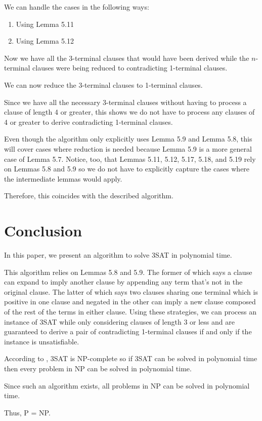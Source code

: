 \documentclass[manuscript]{acmart}
\begin{document}
    We can handle the cases in the following ways:

    \begin{enumerate}
        \item Using Lemma 5.11
        \item Using Lemma 5.12
    \end{enumerate}

    Now we have all the 3-terminal clauses that would have been derived while the $n$-terminal clauses were being reduced to contradicting 1-terminal clauses.

    We can now reduce the 3-terminal clauses to 1-terminal clauses.

    Since we have all the necessary 3-terminal clauses without having to process a clause of length 4 or greater, this shows we do not have to process any clauses of 4 or greater to derive contradicting 1-terminal clauses.
    
    Even though the algorithm only explicitly uses Lemma 5.9 and Lemma 5.8, this will cover cases where reduction is needed because Lemma 5.9 is a more general case of Lemma 5.7. Notice, too, that Lemmas 5.11, 5.12, 5.17, 5.18, and 5.19 rely on Lemmas 5.8 and 5.9 so we do not have to explicitly capture the cases where the intermediate lemmas would apply.

    Therefore, this coincides with the described algorithm.

    \section{Conclusion} 

    In this paper, we present an algorithm to solve 3SAT in polynomial time.

    This algorithm relies on Lemmas 5.8 and 5.9. The former of which says a clause can expand to imply another clause by appending any term that's not in the original clause. The latter of which says two clauses sharing one terminal which is positive in one clause and negated in the other can imply a new clause composed of the rest of the terms in either clause. Using these strategies, we can process an instance of 3SAT  while only considering clauses of length 3 or less and are guaranteed to derive a pair of contradicting 1-terminal clauses if and only if the instance is unsatisfiable.

    According to \cite{Karp1972}, 3SAT is NP-complete so if 3SAT can be solved in polynomial time then every problem in NP can be solved in polynomial time.
    
    Since such an algorithm exists, all problems in NP can be solved in polynomial time.

    Thus, P = NP. 

    
    
\end{document}
